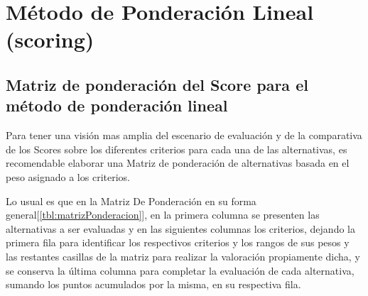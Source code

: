 \chapter{M\'etodo de Ponderaci\'on Lineal (scoring)}
\label{AppendixMPL}

\section{Matriz de ponderaci\'on del Score para el m\'etodo de ponderaci\'on lineal}
Para tener una visi\'on mas amplia del escenario de evaluaci\'on y de la comparativa de los Scores sobre los diferentes criterios para cada una de las alternativas, es recomendable elaborar una Matriz de ponderaci\'on de alternativas basada en el peso asignado a los criterios. 

Lo usual es que en la Matriz De Ponderaci\'on en su forma general[\ref{tbl:matrizPonderacion}], en la primera columna se presenten las alternativas a ser evaluadas y en las siguientes columnas los criterios, dejando la primera fila para identificar los respectivos criterios y los rangos de sus pesos y las restantes casillas de la matriz para realizar la valoraci\'on propiamente dicha, y se conserva la \'ultima columna para completar la evaluaci\'on de cada alternativa, sumando los puntos acumulados por la misma, en su respectiva fila.

\renewcommand{\baselinestretch}{1}

